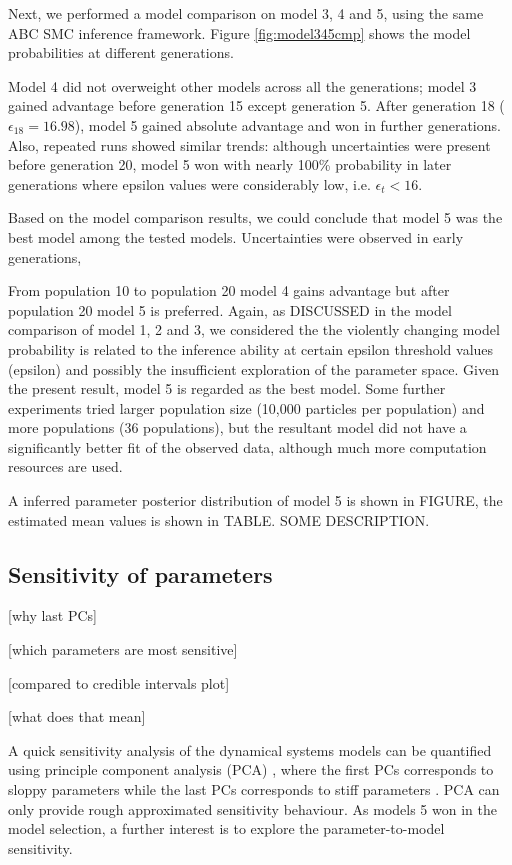 Next, we performed a model comparison on model 3, 4 and 5, using the same ABC SMC inference framework. Figure \ref{fig:model345cmp} shows the model probabilities at different generations.

Model 4 did not overweight other models across all the generations; model 3 gained advantage before generation 15 except generation 5. After generation 18 ($\epsilon_{18} = 16.98$), model 5 gained absolute advantage and won in further generations. Also, repeated runs showed similar trends: although uncertainties were present before generation 20, model 5 won with nearly 100\% probability in later generations where epsilon values were considerably low, i.e. $\epsilon_t<16$.

Based on the model comparison results, we could conclude that model 5 was the best model among the tested models. Uncertainties were observed in early generations, 


From population 10 to population 20 model 4 gains advantage but after population 20 model 5 is preferred. Again, as DISCUSSED in the model comparison of model 1, 2 and 3, we considered the the violently changing model probability is related to the inference ability at certain epsilon threshold values (epsilon) and possibly the insufficient exploration of the parameter space. Given the present result, model 5 is regarded as the best model. Some further experiments tried larger population size (10,000 particles per population) and more populations (36 populations), but the resultant model did not have a significantly better fit of the observed data, although much more computation resources are used. 

A inferred parameter posterior distribution of model 5 is shown in FIGURE, the estimated mean values is shown in TABLE. SOME DESCRIPTION.


\subsection{Sensitivity of parameters}

[why last PCs]

[which parameters are most sensitive]

[compared to credible intervals plot]

[what does that mean]

A quick sensitivity analysis of the dynamical systems models can be quantified using principle component analysis (PCA) \cite{Toni}, where the first PCs corresponds to sloppy parameters while the last PCs corresponds to stiff parameters \cite{sensitivity}. PCA can only provide rough approximated sensitivity behaviour. As models 5 won in the model selection, a further interest is to explore the parameter-to-model sensitivity.

